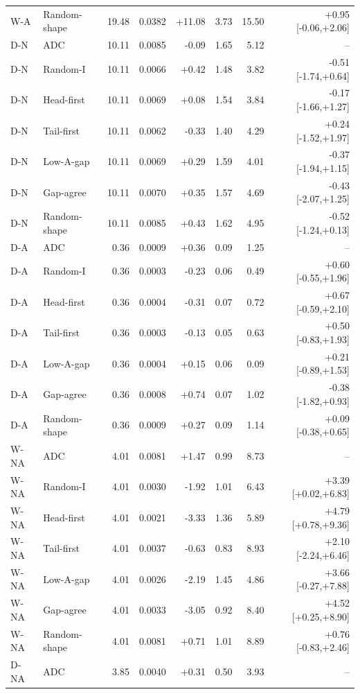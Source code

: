 \begin{table}[htbp]
\begin{tabular}{llrrrrrr}
W-A & Random-shape & 19.48 & 0.0382 & +11.08 & 3.73 & 15.50 & +0.95 [-0.06,+2.06]\\
D-N & ADC & 10.11 & 0.0085 & -0.09 & 1.65 & 5.12 & --\\
D-N & Random-I & 10.11 & 0.0066 & +0.42 & 1.48 & 3.82 & -0.51 [-1.74,+0.64]\\
D-N & Head-first & 10.11 & 0.0069 & +0.08 & 1.54 & 3.84 & -0.17 [-1.66,+1.27]\\
D-N & Tail-first & 10.11 & 0.0062 & -0.33 & 1.40 & 4.29 & +0.24 [-1.52,+1.97]\\
D-N & Low-A-gap & 10.11 & 0.0069 & +0.29 & 1.59 & 4.01 & -0.37 [-1.94,+1.15]\\
D-N & Gap-agree & 10.11 & 0.0070 & +0.35 & 1.57 & 4.69 & -0.43 [-2.07,+1.25]\\
D-N & Random-shape & 10.11 & 0.0085 & +0.43 & 1.62 & 4.95 & -0.52 [-1.24,+0.13]\\
D-A & ADC & 0.36 & 0.0009 & +0.36 & 0.09 & 1.25 & --\\
D-A & Random-I & 0.36 & 0.0003 & -0.23 & 0.06 & 0.49 & +0.60 [-0.55,+1.96]\\
D-A & Head-first & 0.36 & 0.0004 & -0.31 & 0.07 & 0.72 & +0.67 [-0.59,+2.10]\\
D-A & Tail-first & 0.36 & 0.0003 & -0.13 & 0.05 & 0.63 & +0.50 [-0.83,+1.93]\\
D-A & Low-A-gap & 0.36 & 0.0004 & +0.15 & 0.06 & 0.09 & +0.21 [-0.89,+1.53]\\
D-A & Gap-agree & 0.36 & 0.0008 & +0.74 & 0.07 & 1.02 & -0.38 [-1.82,+0.93]\\
D-A & Random-shape & 0.36 & 0.0009 & +0.27 & 0.09 & 1.14 & +0.09 [-0.38,+0.65]\\
W-NA & ADC & 4.01 & 0.0081 & +1.47 & 0.99 & 8.73 & --\\
W-NA & Random-I & 4.01 & 0.0030 & -1.92 & 1.01 & 6.43 & +3.39 [+0.02,+6.83]\\
W-NA & Head-first & 4.01 & 0.0021 & -3.33 & 1.36 & 5.89 & +4.79 [+0.78,+9.36]\\
W-NA & Tail-first & 4.01 & 0.0037 & -0.63 & 0.83 & 8.93 & +2.10 [-2.24,+6.46]\\
W-NA & Low-A-gap & 4.01 & 0.0026 & -2.19 & 1.45 & 4.86 & +3.66 [-0.27,+7.88]\\
W-NA & Gap-agree & 4.01 & 0.0033 & -3.05 & 0.92 & 8.40 & +4.52 [+0.25,+8.90]\\
W-NA & Random-shape & 4.01 & 0.0081 & +0.71 & 1.01 & 8.89 & +0.76 [-0.83,+2.46]\\
D-NA & ADC & 3.85 & 0.0040 & +0.31 & 0.50 & 3.93 & --\\

\end{tabular}
\end{table}

